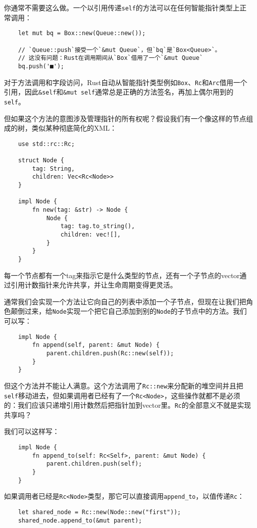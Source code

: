 你通常不需要这么做。一个以引用传递\texttt{self}的方法可以在任何智能指针类型上正常调用：
\begin{verbatim}
    let mut bq = Box::new(Queue::new());

    // `Queue::push`接受一个`&mut Queue`，但`bq`是`Box<Queue>`。
    // 这没有问题：Rust在调用期间从`Box`借用了一个`&mut Queue`
    bq.push('■');
\end{verbatim}

对于方法调用和字段访问，Rust自动从智能指针类型例如\texttt{Box}、\texttt{Rc}和\texttt{Arc}借用一个引用，因此\texttt{\&self}和\texttt{\&mut self}通常总是正确的方法签名，再加上偶尔用到的\texttt{self}。

但如果这个方法的意图涉及管理指针的所有权呢？假设我们有一个像这样的节点组成的树，类似某种彻底简化的XML：
\begin{verbatim}
    use std::rc::Rc;

    struct Node {
        tag: String,
        children: Vec<Rc<Node>>
    }

    impl Node {
        fn new(tag: &str) -> Node {
            Node {
                tag: tag.to_string(),
                children: vec![],
            }
        }
    }
\end{verbatim}

每一个节点都有一个tag来指示它是什么类型的节点，还有一个子节点的vector通过引用计数指针来允许共享，并让生命周期变得更灵活。

通常我们会实现一个方法让它向自己的列表中添加一个子节点，但现在让我们把角色颠倒过来，给\texttt{Node}实现一个把它自己添加到别的\texttt{Node}的子节点中的方法。我们可以写：
\begin{verbatim}
    impl Node {
        fn append(self, parent: &mut Node) {
            parent.children.push(Rc::new(self));
        }
    }
\end{verbatim}

但这个方法并不能让人满意。这个方法调用了\texttt{Rc::new}来分配新的堆空间并且把\texttt{self}移动进去，但如果调用者已经有了一个\texttt{Rc<Node>}，这些操作就都不是必须的：我们应该只递增引用计数然后把指针加到vector里。\texttt{Rc}的全部意义不就是实现共享吗？

我们可以这样写：
\begin{verbatim}
    impl Node {
        fn append_to(self: Rc<Self>, parent: &mut Node) {
            parent.children.push(self);
        }
    }
\end{verbatim}

如果调用者已经是\texttt{Rc<Node>}类型，那它可以直接调用\texttt{append\_to}，以值传递\texttt{Rc}：
\begin{verbatim}
    let shared_node = Rc::new(Node::new("first"));
    shared_node.append_to(&mut parent);
\end{verbatim}

